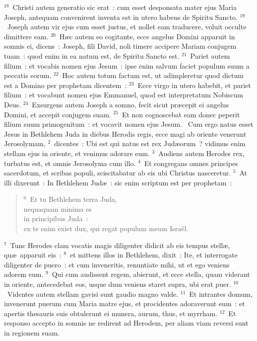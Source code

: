 ${}^{18}$~Christi autem generatio sic erat~: cum esset desponsata mater ejus Maria Joseph, antequam convenirent inventa est in utero habens de Spiritu Sancto.
${}^{19}$~Joseph autem vir ejus cum esset justus, et nollet eam traducere, voluit occulte dimittere eam.
${}^{20}$~H\ae c autem eo cogitante, ecce angelus Domini apparuit in somnis ei, dicens~: Joseph, fili David, noli timere accipere Mariam conjugem tuam~: quod enim in ea natum est, de Spiritu Sancto est.
${}^{21}$~Pariet autem filium~: et vocabis nomen ejus Jesum~: ipse enim salvum faciet populum suum a peccatis eorum.
${}^{22}$~Hoc autem totum factum est, ut adimpleretur quod dictum est a Domino per prophetam dicentem~:
${}^{23}$~Ecce virgo in utero habebit, et pariet filium~: et vocabunt nomen ejus Emmanuel, quod est interpretatum Nobiscum Deus.
${}^{24}$~Exsurgens autem Joseph a somno, fecit sicut pr\ae cepit ei angelus Domini, et accepit conjugem suam.
${}^{25}$~Et non cognoscebat eam donec peperit filium suum primogenitum~: et vocavit nomen ejus Jesum.
~Cum ergo natus esset Jesus in Bethlehem Juda in diebus Herodis regis, ecce magi ab oriente venerunt Jerosolymam,
${}^{2}$~dicentes~: Ubi est qui natus est rex Jud\ae orum~? vidimus enim stellam ejus in oriente, et venimus adorare eum.
${}^{3}$~Audiens autem Herodes rex, turbatus est, et omnis Jerosolyma cum illo.
${}^{4}$~Et congregans omnes principes sacerdotum, et scribas populi, sciscitabatur ab eis ubi Christus nasceretur.
${}^{5}$~At illi dixerunt~: In Bethlehem Jud\ae~: sic enim scriptum est per prophetam~:
\begin{flushleft}\begin{verse}${}^{6}$~Et tu Bethlehem terra Juda,\\ nequaquam minima es\\ in principibus Juda~:\\ ex te enim exiet dux, qui regat populum meum Isra\"el.\end{verse}\end{flushleft}


${}^{7}$~Tunc Herodes clam vocatis magis diligenter didicit ab eis tempus stell\ae , qu\ae\ apparuit eis~:
${}^{8}$~et mittens illos in Bethlehem, dixit~: Ite, et interrogate diligenter de puero~: et cum inveneritis, renuntiate mihi, ut et ego veniens adorem eum.
${}^{9}$~Qui cum audissent regem, abierunt, et ecce stella, quam viderant in oriente, antecedebat eos, usque dum veniens staret supra, ubi erat puer.
${}^{10}$~Videntes autem stellam gavisi sunt gaudio magno valde.
${}^{11}$~Et intrantes domum, invenerunt puerum cum Maria matre ejus, et procidentes adoraverunt eum~: et apertis thesauris suis obtulerunt ei munera, aurum, thus, et myrrham.
${}^{12}$~Et responso accepto in somnis ne redirent ad Herodem, per aliam viam reversi sunt in regionem suam.


